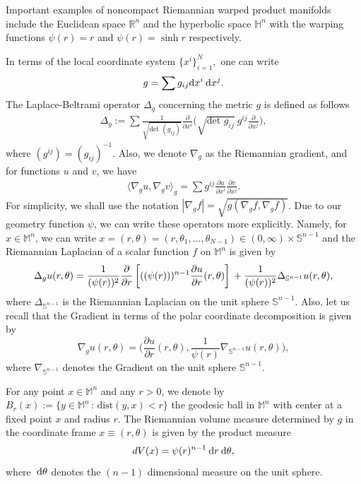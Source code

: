 \documentclass[a4paper,11pt,reqno]{amsart}
\theoremstyle{plain}
\numberwithin{equation}{section} \allowdisplaybreaks
\newcommand{\hn}{\mathbb{H}^n}
\newcommand{\gradg}{\nabla_g}
\newcommand{\lapg}{\Delta_{g}}
\newcommand{\m}{\mathbb{M}^n}
\newcommand{\dx}{\:{\rm d}x}
\newcommand{\dr}{\:{\rm d}r}
\newcommand{\dsn}{\:{\rm d}\theta}
\newcommand{\sn}{\mathbb{S}^{n-1}}
\newcommand{\rn}{\mathbb{R}^n}
\begin{document}
Important examples of noncompact Riemannian warped product manifolds include the Euclidean space $\rn$ and the hyperbolic space $\hn$ with the warping functions $\psi(r)=r$ and $\psi(r)=\sinh r$ respectively.

In terms of the local coordinate system $\{x^i\}_{i=1}^{N},$ one can write
\begin{align*}
g=\sum g_{ij}{\rm d}x^i\dx^j.
\end{align*}
The Laplace-Beltrami operator $\Delta_g$ concerning the metric $g$ is defined as follows
\begin{align*}
\Delta_g:=\sum \frac{1}{\sqrt{\text{det }(g_{ij})}}\frac{\partial}{\partial x^i}\bigg(\sqrt{\text{det }g_{ij}}\:g^{ij}\frac{\partial}{\partial x^j}\bigg),
\end{align*}
where $(g^{ij})=(g_{ij})^{-1}$. Also, we denote $\nabla_g$ as the Riemannian gradient, and for functions $u$ and $v$, we have\begin{align*}
\langle \nabla_g u , \nabla_g v \rangle_g= \sum g^{ij}\frac{\partial u}{\partial x^i}\frac{\partial v}{\partial x^j}.
\end{align*}
For simplicity, we shall use the notation $|\nabla_g f| = \sqrt{g(\nabla_g f,\nabla_g f)}$. Due to our geometry function $\psi$, we can write these operators more explicitly. Namely, for $x\in\m$, we can write $x=(r, \theta)=(r, \theta_{1},\ldots, \theta_{N-1})\in(0,\infty)\times\sn$ and the Riemannian Laplacian of a scalar function $f$ on $\m$ is given by 
\begin{equation*}
	\lapg u (r, \theta)  =
	\frac{1}{(\psi(r))^2} \frac{\partial}{\partial r} \left[ ((\psi (r)))^{n-1} \frac{\partial u}{\partial r}(r, \theta) \right] \\
	+ \frac{1}{(\psi(r))^2 } \Delta_{\mathbb{S}^{n-1}} u(r, \theta),
\end{equation*}
where $\Delta_{\mathbb{S}^{n-1}}$ is the Riemannian Laplacian on the unit sphere $\mathbb{S}^{n-1}$. Also, let us recall that the Gradient in terms of the polar coordinate decomposition is given by
\begin{equation*}
	\gradg u(r, \theta)=\bigg(\frac{\partial u}{\partial r}(r, \theta), \frac{1}{\psi(r)}\nabla_{\sn}u(r, \theta)\bigg),
\end{equation*}
where $\nabla_{\sn}$ denotes the Gradient on the unit sphere $\sn$.

For any point $x\in\m$ and any $r>0$, we denote by $B_r(x):=\{y\in \m\,:\, \text{dist}(y,x)<r \}$ the geodesic ball in $\m$ with center at a fixed point $x$ and radius $r$. The Riemannian volume measure determined by $g$ in the coordinate frame $x\equiv (r,\theta)$ is given by the product measure
\begin{equation*}
    dV(x)=\psi(r)^{n-1}\dr\dsn,
\end{equation*}
where $\dsn$ denotes the $(n-1)$ dimensional measure on the unit sphere.
\end{document}
